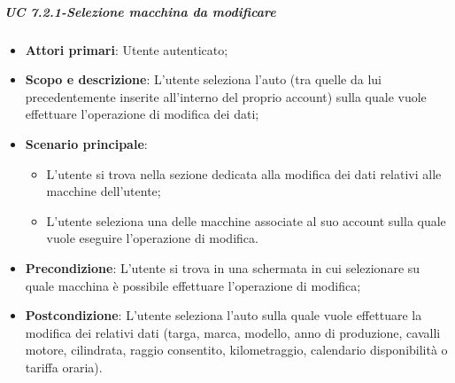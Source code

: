     \subparagraph{UC 7.2.1-Selezione macchina da modificare}
    \begin{itemize}
                \item \textbf{Attori primari}: Utente autenticato;
               
                 \item \textbf{Scopo e descrizione}: L’utente seleziona l'auto (tra quelle da lui precedentemente inserite all'interno del proprio account) sulla quale vuole effettuare l'operazione di modifica dei dati;
                 \item \textbf{Scenario principale}: 
                 \begin{itemize}
                     \item L’utente si trova nella sezione dedicata alla modifica dei dati relativi alle macchine dell'utente;
                     \item L'utente seleziona una delle macchine associate al suo account sulla quale vuole eseguire l'operazione di modifica.          \end{itemize}
                 \item \textbf{Precondizione}: L’utente si trova in una schermata in cui selezionare su quale macchina è possibile effettuare l'operazione di modifica;
                 \item \textbf{Postcondizione}: L’utente seleziona l'auto sulla quale vuole effettuare la modifica dei relativi dati (targa, marca, modello, anno di produzione, cavalli motore, cilindrata, raggio consentito, kilometraggio, calendario disponibilità o tariffa oraria).
                 \end{itemize}
    
